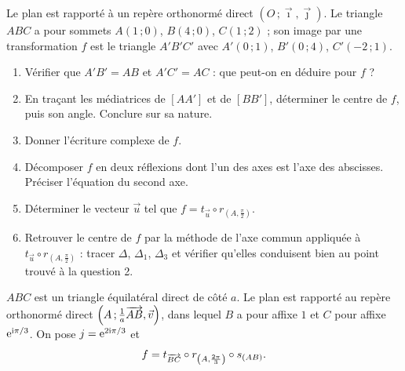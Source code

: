Le plan est rapporté à un repère orthonormé direct
$(O\,;\vec\imath,\vec\jmath)$. Le triangle $ABC$ a pour sommets $A(1\,;0)$,
$B(4\,;0)$, $C(1\,;2)$ ; son image par une transformation $f$ est le triangle
$A'B'C'$ avec $A'(0\,;1)$, $B'(0\,;4)$, $C'(-2\,;1)$.

\begin{center}
\end{center}

\begin{enumerate}
	\item Vérifier que $A'B'=AB$ et $A'C'=AC$ : que peut-on en déduire pour
	$f$ ?
	\item En traçant les médiatrices de $[AA']$ et de $[BB']$, déterminer le
	centre de $f$, puis son angle. Conclure sur sa nature.
	\item Donner l'écriture complexe de $f$.
	\item Décomposer $f$ en deux réflexions dont l'un des axes est l'axe des
	abscisses. Préciser l'équation du second axe.
	\item Déterminer le vecteur $\vec u$ tel que
	$f=t_{\vec u}\circ r_{\left(A,\frac{\pi}{2}\right)}$.
	\item Retrouver le centre de $f$ par la méthode de l'axe commun appliquée
	à $t_{\vec u}\circ r_{\left(A,\frac{\pi}{2}\right)}$ : tracer $\Delta$,
	$\Delta_1$, $\Delta_3$ et vérifier qu'elles conduisent bien au point
	trouvé à la question 2.
\end{enumerate}

$ABC$ est un triangle équilatéral direct de côté $a$. Le plan est rapporté au
repère orthonormé direct $\left(A\,;\frac1a\overrightarrow{AB},\vec v\right)$, dans
lequel $B$ a pour affixe $1$ et $C$ pour affixe $\mathrm{e}^{\mathrm{i}\pi/3}$. On pose
$j=\mathrm{e}^{2\mathrm{i}\pi/3}$ et
$$
f = t_{\overrightarrow{BC}}\circ r_{\left(A,\frac{2\pi}{3}\right)}\circ s_{(AB)} .
$$

